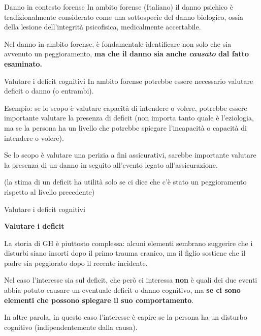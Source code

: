 \documentclass[
  ignorenonframetext,
  aspectratio=169,
]{beamer}
\begin{document}
\begin{frame}{Danno in contesto forense}
\label{danno-in-contesto-forense}
In ambito forense (Italiano) il danno psichico è tradizionalmente
considerato come una sottospecie del danno biologico, ossia della
lesione dell'integrità psicofisica, medicalmente accertabile.

Nel danno in ambito forense, è fondamentale identificare non solo che
sia avvenuto un peggioramento, \textbf{ma che il danno sia anche
\emph{causato} dal fatto esaminato.}
\end{frame}

\begin{frame}{Valutare i deficit cognitivi}
\label{valutare-i-deficit-cognitivi-1}
In ambito forense potrebbe essere necessario valutare deficit o danno (o
entrambi).

Esempio: se lo scopo è valutare capacità di intendere o volere, potrebbe
essere importante valutare la presenza di deficit (non importa tanto
quale è l'eziologia, ma se la persona ha un livello che potrebbe
spiegare l'incapacità o capacità di intendere o volere).

Se lo scopo è valutare una perizia a fini assicurativi, sarebbe
importante valutare la presenza di un danno in seguito all'evento legato
all'assicurazione.

(la stima di un deficit ha utilità solo se ci dice che c'è stato un
peggioramento rispetto al livello precedente)
\end{frame}

\begin{frame}{Valutare i deficit cognitivi}
\label{valutare-i-deficit-cognitivi-2}
\begin{center}
  \textbf{Valutare i deficit}
\end{center}

La storia di GH è piuttosto complessa: alcuni elementi sembrano
suggerire che i disturbi siano insorti dopo il primo trauma cranico, ma
il figlio sostiene che il padre sia peggiorato dopo il recente
incidente.

Nel caso l'interesse sia sul deficit, che però ci interessa \textbf{non}
è quali dei due eventi abbia potuto causare un eventuale deficit o danno
cognitivo, ma \textbf{se ci sono elementi che possono spiegare il suo
comportamento}.

In altre parola, in questo caso l'interesse è capire se la persona ha un
disturbo cognitivo (indipendentemente dalla causa).
\end{frame}
\end{document}
